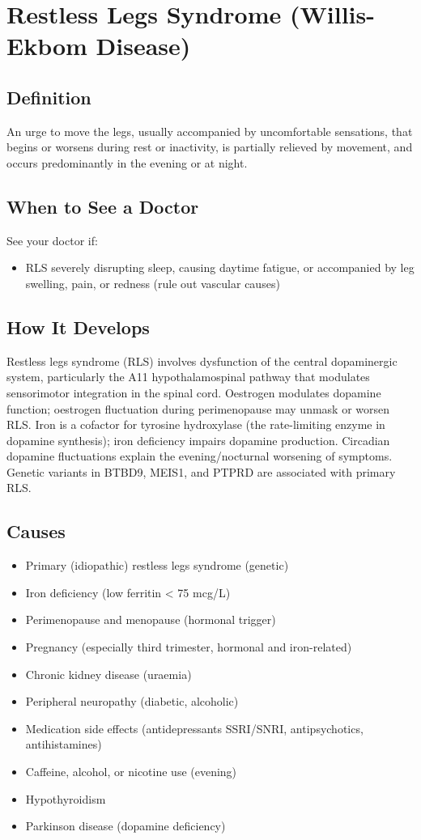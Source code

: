 \chapter{Restless Legs Syndrome (Willis-Ekbom Disease)}

\section*{Definition}
An urge to move the legs, usually accompanied by uncomfortable sensations, that begins or worsens during rest or inactivity, is partially relieved by movement, and occurs predominantly in the evening or at night.

\section*{When to See a Doctor}
See your doctor if:
\begin{itemize}
  \item RLS severely disrupting sleep, causing daytime fatigue, or accompanied by leg swelling, pain, or redness (rule out vascular causes)
\end{itemize}

\section*{How It Develops}
Restless legs syndrome (RLS) involves dysfunction of the central dopaminergic system, particularly the A11 hypothalamospinal pathway that modulates sensorimotor integration in the spinal cord. Oestrogen modulates dopamine function; oestrogen fluctuation during perimenopause may unmask or worsen RLS. Iron is a cofactor for tyrosine hydroxylase (the rate-limiting enzyme in dopamine synthesis); iron deficiency impairs dopamine production. Circadian dopamine fluctuations explain the evening/nocturnal worsening of symptoms. Genetic variants in BTBD9, MEIS1, and PTPRD are associated with primary RLS.

\section*{Causes}
\begin{itemize}
  \item Primary (idiopathic) restless legs syndrome (genetic)
  \item Iron deficiency (low ferritin < 75 mcg/L)
  \item Perimenopause and menopause (hormonal trigger)
  \item Pregnancy (especially third trimester, hormonal and iron-related)
  \item Chronic kidney disease (uraemia)
  \item Peripheral neuropathy (diabetic, alcoholic)
  \item Medication side effects (antidepressants SSRI/SNRI, antipsychotics, antihistamines)
  \item Caffeine, alcohol, or nicotine use (evening)
  \item Hypothyroidism
  \item Parkinson disease (dopamine deficiency)
\end{itemize}

